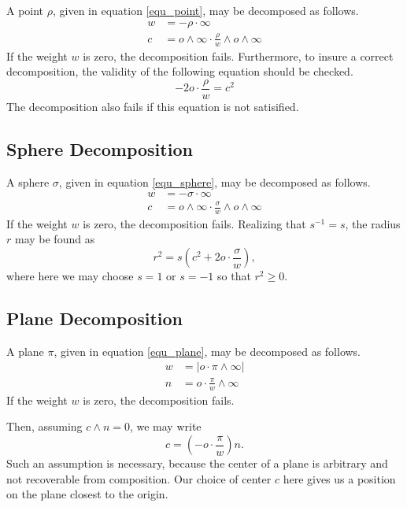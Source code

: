 \documentclass[12pt]{article}
\newcommand{\nvao}{o}
\newcommand{\nvai}{\infty}
\begin{document}
A point $\rho$, given in equation \eqref{equ_point}, may be decomposed as follows.
\begin{align}
w &= -\rho\cdot\nvai \\
c &= \nvao\wedge\nvai\cdot\frac{\rho}{w}\wedge\nvao\wedge\nvai
\end{align}
If the weight $w$ is zero, the decomposition fails.
Furthermore, to insure a correct decomposition, the validity of the following equation should be checked.
\begin{equation}
-2\nvao\cdot\frac{\rho}{w}=c^2
\end{equation}
The decomposition also fails if this equation is not satisified.

\subsection{Sphere Decomposition}

A sphere $\sigma$, given in equation \eqref{equ_sphere}, may be decomposed as follows.
\begin{align}
w &= -\sigma\cdot\nvai \\
c &= \nvao\wedge\nvai\cdot\frac{\sigma}{w}\wedge\nvao\wedge\nvai
\end{align}
If the weight $w$ is zero, the decomposition fails.
Realizing that $s^{-1}=s$, the radius $r$ may be found as
\begin{equation}
r^2 = s\left(c^2+2\nvao\cdot\frac{\sigma}{w}\right),
\end{equation}
where here we may choose $s=1$ or $s=-1$ so that $r^2\geq 0$.

\subsection{Plane Decomposition}

A plane $\pi$, given in equation \eqref{equ_plane}, may be decomposed as follows.
\begin{align}
w &= |\nvao\cdot\pi\wedge\nvai| \\
n &= \nvao\cdot\frac{\pi}{w}\wedge\nvai
\end{align}
If the weight $w$ is zero, the decomposition fails.

Then, assuming $c\wedge n=0$, we may write
\begin{equation}
c=\left(-\nvao\cdot\frac{\pi}{w}\right)n.
\end{equation}
Such an assumption is necessary, because the center of a plane is arbitrary
and not recoverable from composition.  Our choice of center $c$ here
gives us a position on the plane closest to the origin.
\end{document}
